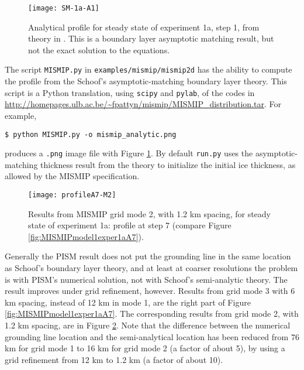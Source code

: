 \begin{figure}[ht]
\centering
\texttt{[image: SM-1a-A1]}
\caption{Analytical profile for steady state of experiment 1a, step 1, from theory in \cite{SchoofMarine1}.  This is a boundary layer asymptotic matching result, but not the exact solution to the equations.}
\label{fig:SMexper1aM1A1}
\end{figure}

The script \texttt{MISMIP.py} in \texttt{examples/mismip/mismip2d} has the ability to compute the profile from the Schoof's \cite{SchoofMarine1} asymptotic-matching boundary layer theory.  This script is a Python translation, using \texttt{scipy} and \texttt{pylab}, of the \Matlab codes in \url{http://homepages.ulb.ac.be/~fpattyn/mismip/MISMIP_distribution.tar}.  For example,

\begin{verbatim}
$ python MISMIP.py -o mismip_analytic.png
\end{verbatim}
 
\noindent produces a \verb|.png| image file with Figure \ref{fig:SMexper1aM1A1}.  By default \texttt{run.py} uses the asymptotic-matching thickness result from the \cite{SchoofMarine1} theory to initialize the initial ice thickness, as allowed by the MISMIP specification.

\begin{figure}[ht]
\centering
\texttt{[image: profileA7-M2]}
\caption{Results from MISMIP grid mode 2, with 1.2 km spacing, for steady state of experiment 1a: profile at step 7 (compare Figure \ref{fig:MISMIPmodel1exper1aA7}).}
\label{fig:MISMIPmode2results}
\end{figure}

Generally the PISM result does not put the grounding line in the same location as Schoof's boundary layer theory, and at least at coarser resolutions the problem is with PISM's numerical solution, not with Schoof's semi-analytic theory.  The result improves under grid refinement, however.  Results from grid mode 3 with 6 km spacing, instead of 12 km in mode 1, are the right part of Figure \ref{fig:MISMIPmodel1exper1aA7}.  The corresponding results from grid mode 2, with 1.2 km spacing, are in Figure \ref{fig:MISMIPmode2results}.  Note that the difference between the numerical grounding line location and the semi-analytical location has been reduced from 76 km for grid mode 1 to 16 km for grid mode 2 (a factor of about 5), by using a grid refinement from 12 km to 1.2 km (a factor of about 10).


